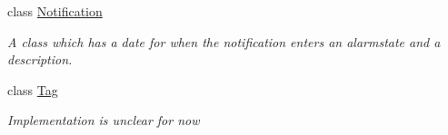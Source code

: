 \begin{DoxyCompactItemize}
class \hyperlink{class_calendar_system_1_1_model_1_1_notification}{Notification}
\begin{DoxyCompactList}\small\item\em A class which has a date for when the notification enters an alarmstate and a description. \end{DoxyCompactList}\item 
class \hyperlink{class_calendar_system_1_1_model_1_1_tag}{Tag}
\begin{DoxyCompactList}\small\item\em Implementation is unclear for now \end{DoxyCompactList}\end{DoxyCompactItemize}
